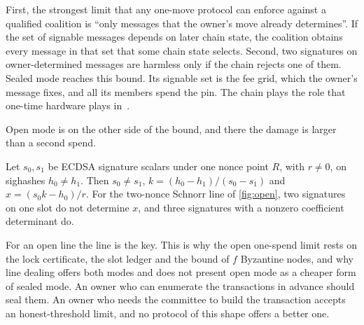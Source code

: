 First, the strongest limit that any one-move protocol can enforce against a qualified coalition is ``only messages that the owner's move already determines''. If the set of signable messages depends on later chain state, the coalition obtains every message in that set that some chain state selects. Second, two signatures on owner-determined messages are harmless only if the chain rejects one of them. Sealed mode reaches this bound. Its signable set is the fee grid, which the owner's message fixes, and all its members spend the pin. The chain plays the role that one-time hardware plays in~\cite{GKR08}.

Open mode is on the other side of the bound, and there the damage is larger than a second spend.

\begin{proposition}\label{prop:twopoints}
Let $s_0, s_1$ be ECDSA signature scalars under one nonce point $R$, with $r \neq 0$, on sighashes $h_0 \neq h_1$. Then $s_0 \neq s_1$, $k = (h_0 - h_1)/(s_0 - s_1)$ and $x = (s_0 k - h_0)/r$. For the two-nonce Schnorr line of \cref{fig:open}, two signatures on one slot do not determine $x$, and three signatures with a nonzero coefficient determinant do.
\end{proposition}

For an open line the line is the key. This is why the open one-spend limit rests on the lock certificate, the slot ledger and the bound of $f$ Byzantine nodes, and why line dealing offers both modes and does not present open mode as a cheaper form of sealed mode. An owner who can enumerate the transactions in advance should seal them. An owner who needs the committee to build the transaction accepts an honest-threshold limit, and no protocol of this shape offers a better one.
